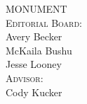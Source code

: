 {\centering\large
    {\LARGE MONUMENT}\\
    \vspace*{\fill}
    {
        \textsc{Editorial Board:}\\
        Avery Becker\\
        McKaila Bushu\\
        Jesse Looney\\[\baselineskip * 5]
    }
    {
        \textsc{Advisor:}\\
        Cody Kucker\\[\baselineskip * 5]
    }
}